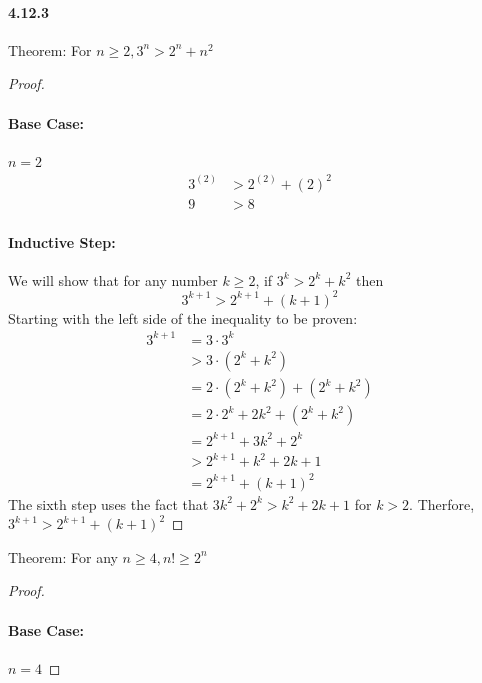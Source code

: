 \documentclass[11pt, letterpaper, twocolumn, fleqn]{article}
\begin{document}
    \paragraph{4.12.3}
        \begin{enumerate}
            \item Theorem: For $n\geq2, 3^n>2^n+n^2$
              \begin{proof}
                \item \paragraph{Base Case:} $n=2$
                  \begin{align*}
                    3^{(2)} &> 2^{(2)}+(2)^2 \\
                    9 &> 8
                  \end{align*}
                  \item \paragraph{Inductive Step:} We will show that for any number $k\geq2$, if $3^k > 2^k + k^2$ then 
                    $$3^{k+1} > 2^{k+1} + (k+1)^2$$
                  Starting with the left side of the inequality to be proven:
                  \begin{align*}
                    3^{k+1} &= 3 \cdot 3^k \\
                    &> 3 \cdot (2^k + k^2) \tag{inductive hypothesis} \\
                    &= 2 \cdot (2^k + k^2) + (2^k + k^2) \\
                    &= 2 \cdot 2^k + 2k^2 + (2^k + k^2) \\
                    &= 2^{k+1} + 3k^2 + 2^k \\
                    &> 2^{k+1} + k^2 + 2k + 1 \\
                    &= 2^{k+1} + (k+1)^2
                  \end{align*}
                  The sixth step uses the fact that $3k^2 + 2^k > k^2 + 2k+1$ for $k > 2$.
                  Therfore, $3^{k+1} > 2^{k+1} + (k+1)^2$
              \end{proof}
            \item Theorem: For any $n \geq 4, n! \geq 2^n$
            \begin{proof}
              \item \paragraph{Base Case:} $n=4$ 

\end{proof}
\end{enumerate}
\end{document}
